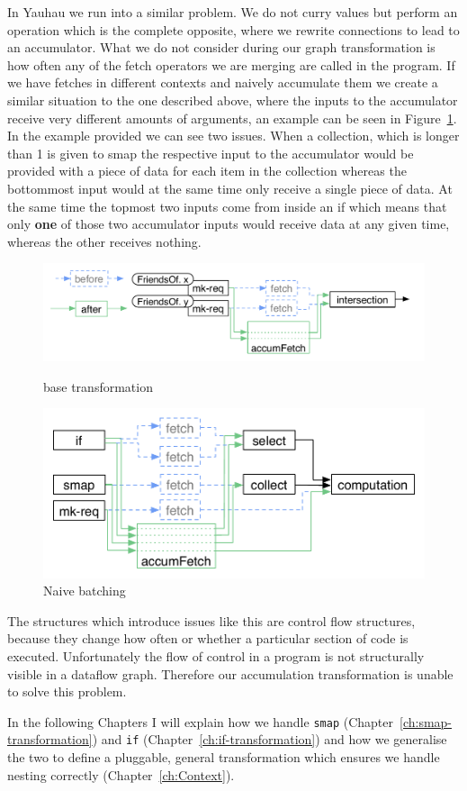 In Yauhau we run into a similar problem.
We do not curry values but perform an operation which is the complete opposite, where we rewrite connections to lead to an accumulator.
What we do not consider during our graph transformation is how often any of the fetch operators we are merging are called in the program.
If we have fetches in different contexts and naively accumulate them we create a similar situation to the one described above, where the inputs to the accumulator receive very different amounts of arguments, an example can be seen in Figure~\ref{fig:naive-batching-context-problem}.
In the example provided we can see two issues.
When a collection, which is longer than 1 is given to smap the respective input to the accumulator would be provided with a piece of data for each item in the collection whereas the bottommost input would at the same time only receive a single piece of data.
At the same time the topmost two inputs come from inside an if which means that only \textbf{one} of those two accumulator inputs would receive data at any given time, whereas the other receives nothing.

\begin{figure}
    \includegraphics[width=\textwidth]{Figures/yauhau-transformation}
	\caption{base transformation}
	\label{figure:yauhau-transformation}
    \includegraphics[width=\textwidth]{../Figures/naive-transformation}
	\caption{Naive batching}
	\label{fig:naive-batching-context-problem}
\end{figure}

The structures which introduce issues like this are control flow structures, because they change how often or whether a particular section of code is executed.
Unfortunately the flow of control in a program is not structurally visible in a dataflow graph.
Therefore our accumulation transformation is unable to solve this problem.

In the following Chapters I will explain how we handle \texttt{smap} (Chapter~\ref{ch:smap-transformation}) and \texttt{if} (Chapter~\ref{ch:if-transformation}) and how we generalise the two to define a pluggable, general transformation which ensures we handle nesting correctly (Chapter~\ref{ch:Context}).

